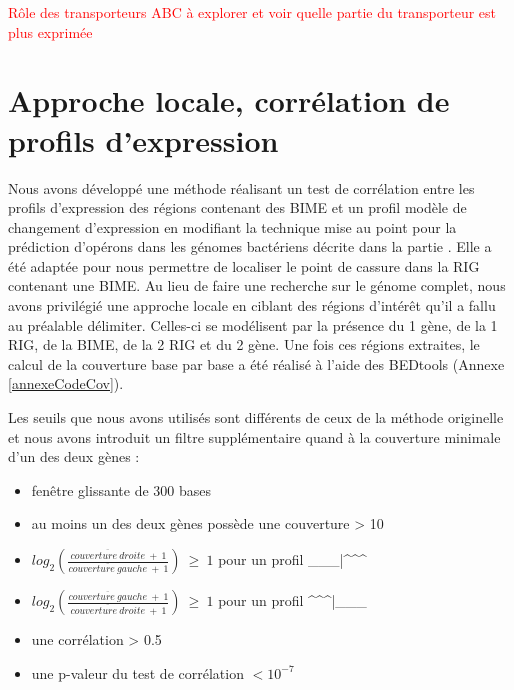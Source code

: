 \documentclass[12pt,a4paper]{report}
\begin{document}
\begin{onehalfspace}
\textcolor{red}{Rôle des transporteurs ABC à explorer et voir quelle partie du transporteur est plus exprimée}

\section*{Approche locale, corrélation de profils d'expression}
\label{approche_locale}
Nous avons développé une méthode réalisant un test de corrélation entre les profils d'expression des régions contenant des BIME et un profil modèle de changement d'expression en modifiant la technique mise au point pour la prédiction d'opérons dans les génomes bactériens \citep{Fortino2014} décrite dans la partie . Elle a été adaptée pour nous permettre de localiser le point de cassure dans la RIG contenant une BIME. Au lieu de faire une recherche sur le génome complet, nous avons privilégié une approche locale en ciblant des régions d'intérêt qu'il a fallu au préalable délimiter. Celles-ci se modélisent par la présence du 1 gène, de la 1 RIG, de la BIME, de la 2 RIG et du 2 gène. Une fois ces régions extraites, le calcul de la couverture base par base a été réalisé à l'aide des BEDtools (Annexe \ref{annexeCodeCov}).



Les seuils que nous avons utilisés sont différents de ceux de la méthode originelle et nous avons introduit un filtre supplémentaire quand à la couverture minimale d'un des deux gènes : 
\begin{itemize}[label=$\bullet$]
\item fenêtre glissante de 300 bases
\item au moins un des deux gènes possède une couverture > 10
\item $log_2(\frac{\overline{couverture~droite}~+~1}{\overline{couverture~gauche}~+~1})~\geq~1$ pour un profil \_\_\_|\^{ }\^{ }\^{ }
\item $log_2(\frac{\overline{couverture~gauche}~+~1}{\overline{couverture~droite}~+~1})~\geq~1$ pour un profil \^{ }\^{ }\^{ }|\_\_\_
\item une corrélation > 0.5
\item une p-valeur du test de corrélation $< 10^{-7}$
\end{itemize}


\end{onehalfspace}
\end{document}
